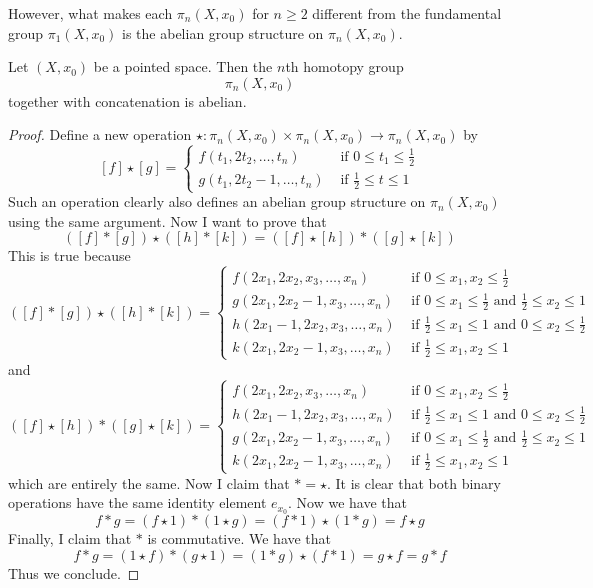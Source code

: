 \documentclass[a4paper]{article}
\begin{document}
However, what makes each $\pi_n(X,x_0)$ for $n\geq 2$ different from the fundamental group $\pi_1(X,x_0)$ is the abelian group structure on $\pi_n(X,x_0)$. 

\begin{thm}{}{} Let $(X,x_0)$ be a pointed space. Then the $n$th homotopy group $$\pi_n(X,x_0)$$ together with concatenation is abelian. 
\begin{proof}
Define a new operation $\star:\pi_n(X,x_0)\times\pi_n(X,x_0)\to\pi_n(X,x_0)$ by $$[f]\star[g]=\begin{cases}
f(t_1,2t_2,\dots,t_n) & \text{ if } 0\leq t_1\leq\frac{1}{2}\\
g(t_1,2t_2-1,\dots,t_n) & \text{ if } \frac{1}{2}\leq t\leq 1
\end{cases}$$ Such an operation clearly also defines an abelian group structure on $\pi_n(X,x_0)$ using the same argument. Now I want to prove that $$([f]\ast[g])\star([h]\ast [k])=([f]\star [h])\ast([g]\star [k])$$ This is true because $$([f]\ast[g])\star([h]\ast [k])=\begin{cases}
f(2x_1,2x_2,x_3,\dots,x_n) & \text{ if } 0\leq x_1,x_2\leq\frac{1}{2}\\
g(2x_1,2x_2-1,x_3,\dots,x_n) & \text{ if } 0\leq x_1\leq\frac{1}{2} \text{ and } \frac{1}{2}\leq x_2\leq 1\\
h(2x_1-1,2x_2,x_3,\dots,x_n) & \text{ if } \frac{1}{2}\leq x_1\leq 1 \text{ and } 0\leq x_2\leq\frac{1}{2}\\
k(2x_1,2x_2-1,x_3,\dots,x_n) & \text{ if } \frac{1}{2}\leq x_1,x_2\leq 1
\end{cases}$$ and $$([f]\star [h])\ast([g]\star [k])=\begin{cases}
f(2x_1,2x_2,x_3,\dots,x_n) & \text{ if } 0\leq x_1,x_2\leq\frac{1}{2}\\
h(2x_1-1,2x_2,x_3,\dots,x_n) & \text{ if } \frac{1}{2}\leq x_1\leq 1 \text{ and } 0\leq x_2\leq\frac{1}{2}\\
g(2x_1,2x_2-1,x_3,\dots,x_n) & \text{ if } 0\leq x_1\leq\frac{1}{2} \text{ and } \frac{1}{2}\leq x_2\leq 1\\
k(2x_1,2x_2-1,x_3,\dots,x_n) & \text{ if } \frac{1}{2}\leq x_1,x_2\leq 1
\end{cases}$$ which are entirely the same. Now I claim that $\ast=\star$. It is clear that both binary operations have the same identity element $e_{x_0}$. Now we have that $$f\ast g=(f\star 1)\ast (1\star g)=(f\ast 1)\star(1\ast g)=f\star g$$ Finally, I claim that $\ast$ is commutative. We have that $$f\ast g=(1\star f)\ast(g\star 1)=(1\ast g)\star(f\ast 1)=g\star f=g\ast f$$ Thus we conclude. 
\end{proof}
\end{thm}
\end{document}
